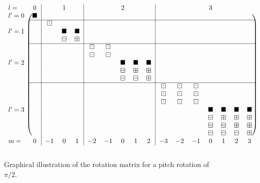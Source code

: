 \begin{figure}[h]
\[
    \begin{blockarray}{lc|ccc|ccccc|ccccccc}
    l= & 0 & & 1 & & & & 2 & & & & & & 3 & & & \\
    \begin{block}{l(c|ccc|ccccc|ccccccc)}
     l' = 0 & \blacksquare &  &  &  &  &  &  &  &  &  &  &  &  &  &  &  \\ \cline{2-17}
     &  & \boxdot &  &  &  &  &  &  &  &  &  &  &  &  &  &  \\
     l' = 1 &  &  & \blacksquare & \blacksquare &  &  &  &  &  &  &  &  &  &  &  &  \\
     &  &  & \boxminus & \boxplus &  &  &  &  &  &  &  &  &  &  &  &  \\ \cline{2-17}
     &  &  &  &  & \boxdot & \boxdot &  &  &  &  &  &  &  &  &  &  \\
     &  &  &  &  & \boxdot & \boxdot &  &  &  &  &  &  &  &  &  &  \\
     l' = 2 &  &  &  &  &  &  & \blacksquare & \blacksquare & \blacksquare &  &  &  &  &  &  &  \\
     &  &  &  &  &  &  & \boxminus & \boxplus & \boxplus &  &  &  &  &  &  &  \\
     &  &  &  &  &  &  & \boxminus & \boxminus & \boxplus &  &  &  &  &  &  &  \\ \cline{2-17}
     &  &  &  &  &  &  &  &  &  & \boxdot & \boxdot & \boxdot &  &  &  &  \\
     &  &  &  &  &  &  &  &  &  & \boxdot & \boxdot & \boxdot &  &  &  &  \\
     &  &  &  &  &  &  &  &  &  & \boxdot & \boxdot & \boxdot &  &  &  &  \\
     l' = 3 &  &  &  &  &  &  &  &  &  &  &  &  & \blacksquare & \blacksquare & \blacksquare & \blacksquare \\
     &  &  &  &  &  &  &  &  &  &  &  &  & \boxminus & \boxplus & \boxplus & \boxplus \\
     &  &  &  &  &  &  &  &  &  &  &  &  & \boxminus & \boxminus & \boxplus & \boxplus \\
     &  &  &  &  &  &  &  &  &  &  &  &  & \boxminus & \boxminus & \boxminus & \boxplus \\
    \end{block}
    m= & 0 & -1 & 0 & 1 & -2 & -1 & 0 & 1 & 2 & -3 & -2 & -1 & 0 & 1 & 2 & 3 \\
    \end{blockarray}
\]
\caption{Graphical illustration of the rotation matrix for a pitch rotation of $\pi/2$.}
\label{fig:A1_Navigation_Filters:Fixed_Pitch}
\end{figure}

